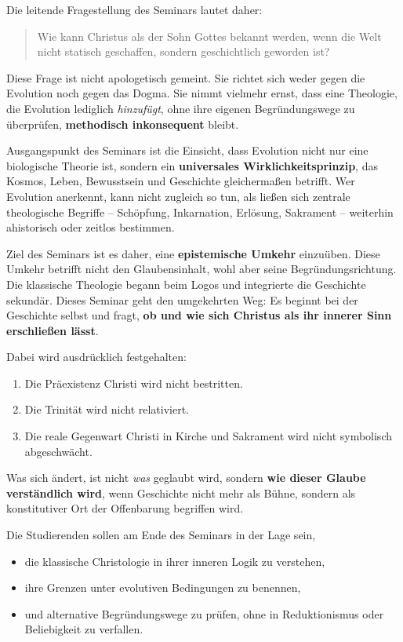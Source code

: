 \documentclass[
]{article}
\begin{document}
Die leitende Fragestellung des Seminars lautet daher:

\begin{quote}
Wie kann Christus als der Sohn Gottes bekannt werden, wenn die Welt nicht statisch geschaffen, sondern geschichtlich geworden ist?
\end{quote}

Diese Frage ist nicht apologetisch gemeint. Sie richtet sich weder gegen die Evolution noch gegen das Dogma. Sie nimmt vielmehr ernst, dass eine Theologie, die Evolution lediglich \emph{hinzufügt}, ohne ihre eigenen Begründungswege zu überprüfen, \textbf{methodisch inkonsequent} bleibt.

Ausgangspunkt des Seminars ist die Einsicht, dass Evolution nicht nur eine biologische Theorie ist, sondern ein \textbf{universales Wirklichkeitsprinzip}, das Kosmos, Leben, Bewusstsein und Geschichte gleichermaßen betrifft. Wer Evolution anerkennt, kann nicht zugleich so tun, als ließen sich zentrale theologische Begriffe -- Schöpfung, Inkarnation, Erlösung, Sakrament -- weiterhin ahistorisch oder zeitlos bestimmen.

Ziel des Seminars ist es daher, eine \textbf{epistemische Umkehr} einzuüben. Diese Umkehr betrifft nicht den Glaubensinhalt, wohl aber seine Begründungsrichtung. Die klassische Theologie begann beim Logos und integrierte die Geschichte sekundär. Dieses Seminar geht den umgekehrten Weg: Es beginnt bei der Geschichte selbst und fragt, \textbf{ob und wie sich Christus als ihr innerer Sinn erschließen lässt}.

Dabei wird ausdrücklich festgehalten:

\begin{enumerate}
\def\labelenumi{\arabic{enumi}.}
\item
  Die Präexistenz Christi wird nicht bestritten.
\item
  Die Trinität wird nicht relativiert.
\item
  Die reale Gegenwart Christi in Kirche und Sakrament wird nicht symbolisch abgeschwächt.
\end{enumerate}

Was sich ändert, ist nicht \emph{was} geglaubt wird, sondern \textbf{wie dieser Glaube verständlich wird}, wenn Geschichte nicht mehr als Bühne, sondern als konstitutiver Ort der Offenbarung begriffen wird.

Die Studierenden sollen am Ende des Seminars in der Lage sein,

\begin{itemize}
\item
  die klassische Christologie in ihrer inneren Logik zu verstehen,
\item
  ihre Grenzen unter evolutiven Bedingungen zu benennen,
\item
  und alternative Begründungswege zu prüfen, ohne in Reduktionismus oder Beliebigkeit zu verfallen.
\end{itemize}
\end{document}
